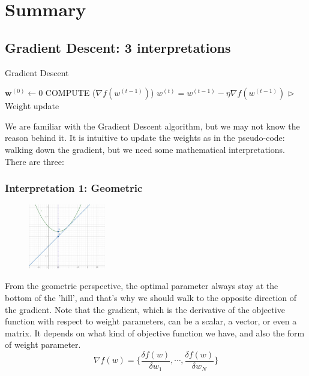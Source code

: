 \documentclass[11pt]{article}
\begin{document}
\section{Summary}
\subsection{Gradient Descent: 3 interpretations}
\normalfont

\begin{algorithm}[H]
\caption{Gradient Descent}
\begin{algorithmic}[1]
\STATE $\textbf{w}^{(0)} \leftarrow {0}$ \hfill
{}
\STATE \textsc{COMPUTE} ($\nabla f(w^{(t-1)})$) \hfill
\STATE $w^{(t)} = w^{(t - 1)} - \eta \nabla f(w^{(t - 1)}) $  \hfill $\triangleright$ Weight update
\ENDFOR
\end{algorithmic}
\end{algorithm}

We are familiar with the Gradient Descent algorithm, but we may not know the reason behind it. It is intuitive to update the weights as in the pseudo-code: walking down the gradient, but we need some mathematical interpretations. There are three: 
\subsubsection*{Interpretation 1: Geometric}
\begin{figure}[H]
    \centering
    \includegraphics[width=0.3\textwidth]{pic/lo.jpg}
\end{figure}

From the geometric perspective, the optimal parameter always stay at the bottom of the 'hill', and that's why we should walk to the opposite direction of the gradient. Note that the gradient, which is the derivative of the objective function with respect to weight parameters, can be a scalar, a vector, or even  a matrix. It depends on what kind of objective function we have, and also the form of weight parameter.
\[\nabla f(w) = \{\frac{\delta f(w)}{\delta w_1}, \cdots, \frac{\delta f(w)}{\delta w_N}\}\]
\end{document}
